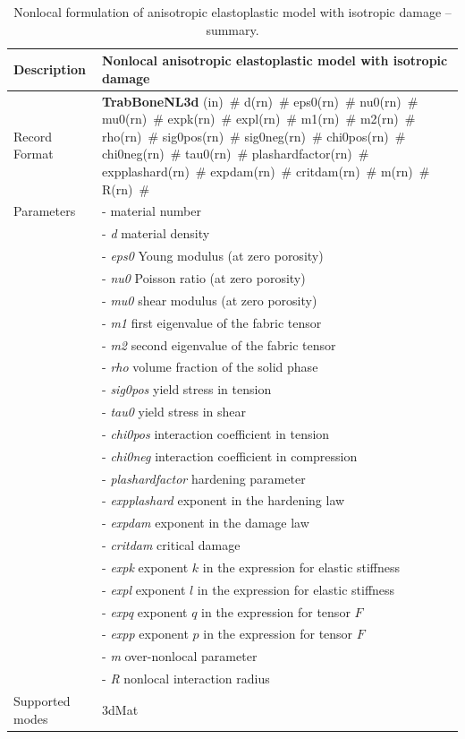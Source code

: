 \documentclass[a4paper]{article}
\newcommand{\mbf}[1]{\mbox{\boldmath$#1$}}
\newcommand{\descitem}[1]{{\noindent \bf #1}}
\newcommand{\elemparam}[2]{{{#1\tiny (#2)}~\#}}
\newcommand{\param}[1]{{\it #1}}
\newenvironment{mmt}{\begin{tabular}{|l|p{9cm}|}}{\end{tabular}\\}
\newenvironment{mmt}{\begin{tabular}{|l|l|}}{\end{tabular}\\}
\begin{document}
\begin{table}[!htb]
\begin{mmt}
\hline
Description & Nonlocal anisotropic elastoplastic model with isotropic damage\\
\hline
Record Format & \descitem{TrabBoneNL3d}  \elemparam{}{in}
\elemparam{d}{rn} \elemparam{eps0}{rn} \elemparam{nu0}{rn} \elemparam{mu0}{rn} \elemparam{expk}{rn} \elemparam{expl}{rn} \elemparam{m1}{rn} \elemparam{m2}{rn} \elemparam{rho}{rn}
\elemparam{sig0pos}{rn} \elemparam{sig0neg}{rn} \elemparam{chi0pos}{rn} \elemparam{chi0neg}{rn} \elemparam{tau0}{rn} \elemparam{plashardfactor}{rn} \elemparam{expplashard}{rn} \elemparam{expdam}{rn} \elemparam{critdam}{rn} \elemparam{m}{rn} \elemparam{R}{rn}\\
Parameters &- \param{} material number\\
&- \param{d} material density\\
&- \param{eps0} Young modulus (at zero porosity)\\
&- \param{nu0} Poisson ratio (at zero porosity)\\
&- \param{mu0} shear modulus (at zero porosity)\\
&- \param{m1} first eigenvalue of the fabric tensor\\
&- \param{m2} second eigenvalue of the fabric tensor\\
&- \param{rho} volume fraction of the solid phase\\
&- \param{sig0pos} yield stress in tension\\
&- \param{tau0} yield stress in shear\\
&- \param{chi0pos} interaction coefficient in tension\\
&- \param{chi0neg} interaction coefficient in compression\\
&- \param{plashardfactor} hardening parameter\\
&- \param{expplashard} exponent in the hardening law\\
&- \param{expdam} exponent in the damage law\\
&- \param{critdam} critical damage\\
&- \param{expk} exponent $k$ in the expression for elastic stiffness\\
&- \param{expl} exponent $l$ in the expression for elastic stiffness\\
&- \param{expq} exponent $q$ in the expression for tensor \mbf{F}\\
&- \param{expp} exponent $p$ in the expression for tensor \mbf{F}\\
&- \param{m} over-nonlocal parameter\\
&- \param{R} nonlocal interaction radius\\
Supported modes& 3dMat\\
\hline
\end{mmt}
\caption{Nonlocal formulation of anisotropic elastoplastic model with isotropic damage -- summary.}
\label{trabboneNl_table}
\end{table}
\end{document}
